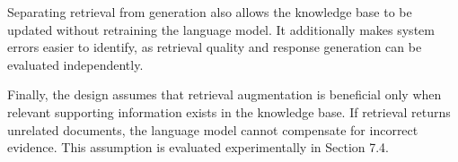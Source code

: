 Separating retrieval from generation also allows the knowledge base to be updated without retraining the language model. It additionally makes system errors easier to identify, as retrieval quality and response generation can be evaluated independently.

Finally, the design assumes that retrieval augmentation is beneficial only when relevant supporting information exists in the knowledge base. If retrieval returns unrelated documents, the language model cannot compensate for incorrect evidence. This assumption is evaluated experimentally in Section 7.4.
